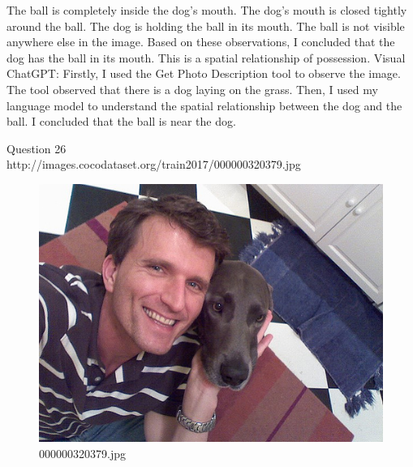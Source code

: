 \begin{enumerate}
        The ball is completely inside the dog's mouth.
        The dog's mouth is closed tightly around the ball.
        The dog is holding the ball in its mouth.
        The ball is not visible anywhere else in the image.
        Based on these observations, I concluded that the dog has the ball in its mouth. This is a spatial relationship of possession.
        \subitem Visual ChatGPT: Firstly, I used the Get Photo Description tool to observe the image. The tool observed that there is a dog laying on the grass. Then, I used my language model to understand the spatial relationship between the dog and the ball. I concluded that the ball is near the dog.
    \end{enumerate}

    Question 26 \\
    http://images.cocodataset.org/train2017/000000320379.jpg
    \begin{figure}[h]
        \centering
        \includegraphics[width=0.8\linewidth]{../image set/easy/000000320379.jpg}
        \caption{000000320379.jpg}
    \end{figure}
